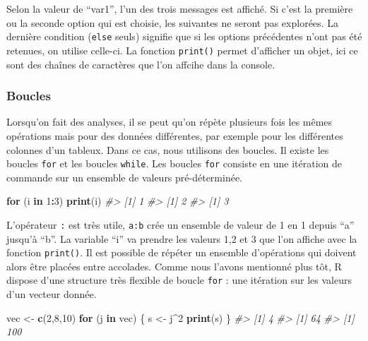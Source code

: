 \documentclass[]{article}
\newenvironment{Shaded}{\begin{snugshade}}{\end{snugshade}}
\newcommand{\CommentTok}[1]{\textcolor[rgb]{0.56,0.35,0.01}{\textit{#1}}}
\newcommand{\ControlFlowTok}[1]{\textcolor[rgb]{0.13,0.29,0.53}{\textbf{#1}}}
\newcommand{\DecValTok}[1]{\textcolor[rgb]{0.00,0.00,0.81}{#1}}
\newcommand{\KeywordTok}[1]{\textcolor[rgb]{0.13,0.29,0.53}{\textbf{#1}}}
\newcommand{\NormalTok}[1]{#1}
\newcommand{\OperatorTok}[1]{\textcolor[rgb]{0.81,0.36,0.00}{\textbf{#1}}}
\newcommand{\StringTok}[1]{\textcolor[rgb]{0.31,0.60,0.02}{#1}}
\begin{document}
Selon la valeur de ``var1'', l'un des trois messages est affiché.
Si c'est la première ou la seconde option qui est choisie, les suivantes ne seront pas explorées. La dernière condition (\texttt{else} seuls) signifie que si les options précédentes n'ont pas été retenues, on utilise celle-ci.
La fonction \texttt{print()} permet d'afficher un objet, ici ce sont des chaînes de caractères que l'on affcihe dans la console.

\hypertarget{boucles}{%
\subsubsection*{Boucles}\label{boucles}}

Lorsqu'on fait des analyses, il se peut qu'on répète plusieurs fois les mêmes opérations mais pour des données différentes, par exemple pour les différentes colonnes d'un tableux. Dans ce cas, nous utilisons des boucles. Il existe les boucles \texttt{for} et les boucles \texttt{while}. Les boucles \texttt{for} consiste en une itération de commande sur un ensemble de valeurs pré-déterminée.

\begin{Shaded}
\begin{Highlighting}[]
\ControlFlowTok{for}\NormalTok{ (i }\ControlFlowTok{in} \DecValTok{1}\OperatorTok{:}\DecValTok{3}\NormalTok{) }\KeywordTok{print}\NormalTok{(i)}
\CommentTok{#> [1] 1}
\CommentTok{#> [1] 2}
\CommentTok{#> [1] 3}
\end{Highlighting}
\end{Shaded}

L'opérateur \texttt{:} est très utile, \texttt{a:b} crée un ensemble de valeur de 1 en 1 depuis ``a'' jusqu'à ``b''. La variable ``i'' va prendre les valeurs 1,2 et 3 que l'on affiche avec la fonction \texttt{print()}. Il est possible de répéter un ensemble d'opérations qui doivent alors être placées entre accolades.
Comme nous l'avons mentionné plus tôt, R dispose d'une structure très flexible de boucle \texttt{for} : une itération sur les valeurs d'un vecteur donnée.

\begin{Shaded}
\begin{Highlighting}[]
\NormalTok{vec <-}\StringTok{ }\KeywordTok{c}\NormalTok{(}\DecValTok{2}\NormalTok{,}\DecValTok{8}\NormalTok{,}\DecValTok{10}\NormalTok{)}
\ControlFlowTok{for}\NormalTok{ (j }\ControlFlowTok{in}\NormalTok{ vec) \{}
\NormalTok{  s <-}\StringTok{ }\NormalTok{j}\OperatorTok{^}\DecValTok{2}
  \KeywordTok{print}\NormalTok{(s)}
\NormalTok{\}}
\CommentTok{#> [1] 4}
\CommentTok{#> [1] 64}
\CommentTok{#> [1] 100}
\end{Highlighting}
\end{Shaded}
\end{document}
